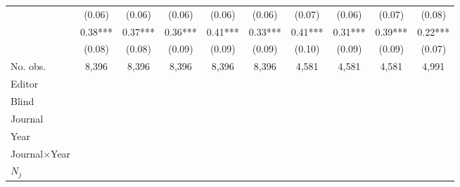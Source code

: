 \begin{table}
\begin{threeparttable}
\begin{tabular}{p{3cm}S@{}S@{}S@{}S@{}S@{}S@{}S@{}S@{}S@{}}
                                          &      (0.06)   &      (0.06)   &      (0.06)   &      (0.06)   &      (0.06)   &      (0.07)   &      (0.06)   &      (0.07)   &      (0.08)   \\
               &        0.38***&        0.37***&        0.36***&        0.41***&        0.33***&        0.41***&        0.31***&        0.39***&        0.22***\\
                                          &      (0.08)   &      (0.08)   &      (0.09)   &      (0.09)   &      (0.09)   &      (0.10)   &      (0.09)   &      (0.09)   &      (0.07)   \\
            \midrule
            No. obs.                      &       8,396   &       8,396   &       8,396   &       8,396   &       8,396   &       4,581   &       4,581   &       4,581   &       4,991   \\
            \midrule
            Editor               &           {}   &           {}   &           {}   &           {}   &           {}   &           {}   &           {}   &           {}   &           {}   \\
            Blind                         &           {}   &           {}   &           {}   &           {}   &           {}   &           {}   &           {}   &           {}   &           {}   \\
            Journal                       &           {}   &           {}   &               &               &               &               &               &               &               \\
            Year                          &               &           {}   &               &               &               &               &               &               &               \\
            Journal\(\times\)Year                  &               &               &           {}   &           {}   &           {}   &           {}   &           {}   &           {}   &           {}   \\
            \(N_j\)                       &               &               &               &           {}   &           {}   &           {}   &           {}   &           {}   &           {}   \\

\end{tabular}
\end{threeparttable}
\end{table}
